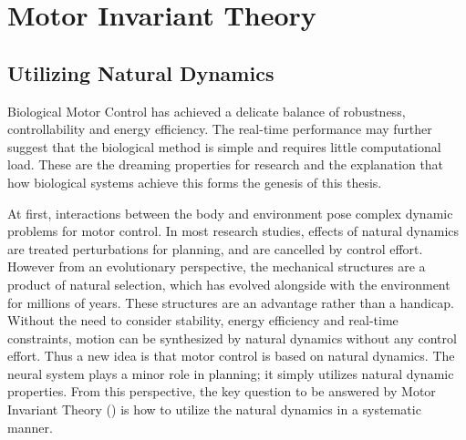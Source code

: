 %

\section{Motor Invariant Theory}
\subsection{Utilizing Natural Dynamics}
Biological Motor Control has achieved a delicate balance of robustness, controllability and energy efficiency.
The real-time performance may further suggest that the biological method  is simple and requires little computational load.
These are the dreaming properties for \cms research and  the explanation that how biological systems achieve this  forms the genesis of this thesis.



At first, interactions between the body and environment pose  complex dynamic problems for motor control.
In most \cms research studies, effects of natural dynamics are treated  perturbations for planning, and are cancelled by control effort.
However from an evolutionary perspective, the mechanical structures are a product of natural selection, which has evolved alongside with the environment for millions of years. 
These structures are an advantage rather than a handicap. 
Without the need to consider stability, energy efficiency and real-time constraints,   motion can be synthesized by natural dynamics without any control effort.
Thus a new idea is that motor control is based on natural dynamics.
The neural system plays a minor role in planning; it simply utilizes natural dynamic properties.
From this perspective, the key question to be answered by Motor Invariant Theory ({\moit}) is how to utilize the natural dynamics in a systematic manner.








